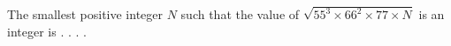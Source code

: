 The smallest positive integer $N$ such that the value of $\sqrt{55^3 \times 66^2\times 77 \times N}$ is an integer is . . . .
